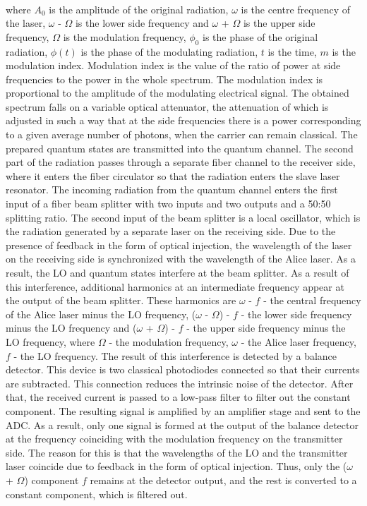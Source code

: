 {\begin{align}
\end{align} where $A_0$ is the amplitude of the original radiation, $\omega$ is the centre frequency of the laser, $\omega$ - $\Omega$ is the lower side frequency and $\omega$ + $\Omega$ is the upper side frequency, $\Omega$ is the modulation frequency, $\phi_0$ is the phase of the original radiation, $\phi(t)$ is the phase of the modulating radiation, $t$ is the time, $m$ is the modulation index. Modulation index is the value of the ratio of power at side frequencies to the power in the whole spectrum. The modulation index is proportional to the amplitude of the modulating electrical signal.  The obtained spectrum falls on a variable optical attenuator, the attenuation of which is adjusted in such a way that at the side frequencies there is a power corresponding to a given average number of photons, when the carrier can remain classical. The prepared quantum states are transmitted into the quantum channel. 
The second part of the radiation passes through a separate fiber channel to the receiver side, where it enters the fiber circulator so that the radiation enters the slave laser resonator. 
The incoming radiation from the quantum channel enters the first input of a fiber beam splitter with two inputs and two outputs and a 50:50 splitting ratio. The second input of the beam splitter is a local oscillator, which is the radiation generated by a separate laser on the receiving side. Due to the presence of feedback in the form of optical injection, the wavelength of the laser on the receiving side is synchronized with the wavelength of the Alice laser. As a result, the LO and quantum states interfere at the beam splitter. As a result of this interference, additional harmonics at an intermediate frequency appear at the output of the beam splitter. These harmonics are $\omega$ - $f$ - the central frequency of the Alice laser minus the LO frequency, ($\omega$ - $\Omega$) - $f$ - the lower side frequency minus the LO frequency and ($\omega$ + $\Omega$) - $f$ - the upper side frequency minus the LO frequency, where $\Omega$ - the modulation frequency, $\omega$ - the Alice laser frequency, $f$ - the LO frequency. 
\newline The result of this interference is detected by a balance detector. This device is two classical photodiodes connected so that their currents are subtracted. This connection reduces the intrinsic noise of the detector. After that, the received current is passed to a low-pass filter to filter out the constant component. The resulting signal is amplified by an amplifier stage and sent to the ADC.  As a result, only one signal is formed at the output of the balance detector at the frequency coinciding with the modulation frequency on the transmitter side. The reason for this is that the wavelengths of the LO and the transmitter laser coincide due to feedback in the form of optical injection. Thus, only the ($\omega$ + $\Omega$) component $f$ remains at the detector output, and the rest is converted to a constant component, which is filtered out. 
}
